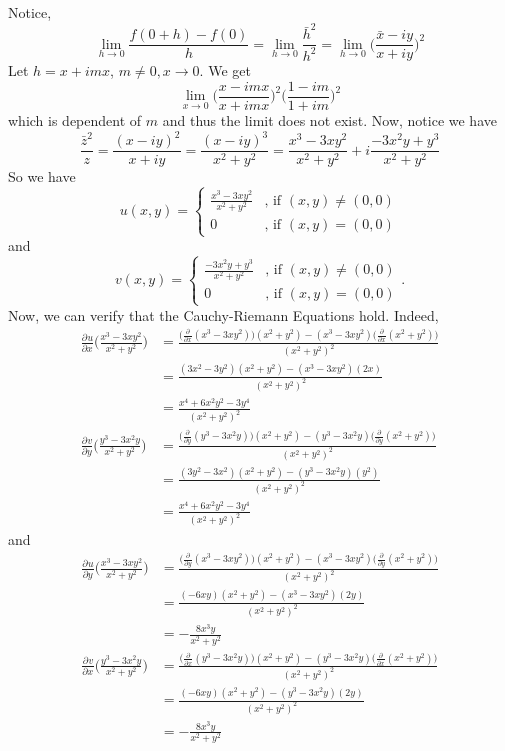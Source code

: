 \documentclass[11pt]{article}
\newcommand*{\pd}[3][]{\ensuremath{\frac{\partial^{#1} #2}{\partial #3^{#1}}}}
\begin{document}
Notice,
\begin{equation*}
\lim_{h \to 0} \frac{f(0+h) - f(0)}{h}
= \lim_{h \to 0} \frac{\bar h^2}{h^2}
= \lim_{h \to 0} \bigg(\frac{\bar x-iy}{x+iy}\bigg)^2
\end{equation*}
Let $h = x + imx$, $m \neq 0, x \to 0$. We get
\begin{equation*}
\lim_{x \to 0} \bigg( \frac{x - imx}{x + imx}\bigg)^2
\bigg( \frac{1 - im}{1 + im}\bigg)^2
\end{equation*}
which is dependent of $m$ and thus the limit does not exist. Now, notice we have
\begin{equation*}
\frac{\bar z^2}{z} = \frac{(x - iy)^2}{x+iy} = \frac{(x-iy)^3}{x^2+y^2}
= \frac{x^3 - 3xy^2}{x^2+y^2} + i \frac{-3x^2y + y^3}{x^2+y^2}
\end{equation*}
So we have
\begin{equation*}
u(x,y) =
\begin{cases}
\frac{x^3 - 3xy^2}{x^2+y^2} & \text{, if } (x,y) \neq (0,0)\\
0 & \text{, if } (x,y) = (0,0)
\end{cases}
\end{equation*}
and
\begin{equation*}
v(x,y) = 
\begin{cases}
\frac{-3x^2y + y^3}{x^2+y^2} & \text{, if } (x,y) \neq (0,0)\\
0 & \text{, if } (x,y) = (0,0)
\end{cases}.
\end{equation*}
Now, we can verify that the Cauchy-Riemann Equations hold. Indeed,
\begin{align*}
\pd{u}{x}\bigg(\frac{x^3 - 3xy^2}{x^2+y^2}\bigg)
&= \frac{\big(\pd{}{x}(x^3 - 3xy^2)\big)(x^2 + y^2) - (x^3 -
3xy^2)\big(\pd{}{x}(x^2+y^2)\big)}{(x^2 + y^2)^2}\\
&= \frac{(3x^2 - 3y^2)(x^2 + y^2) - (x^3 - 3xy^2)(2x)}{(x^2 + y^2)^2}\\
&= \frac{x^4 + 6x^2y^2 - 3y^4}{(x^2 + y^2)^2}\\
\pd{v}{y}\bigg(\frac{y^3 - 3x^2y}{x^2+y^2} \bigg)
&= \frac{\big(\pd{}{y}(y^3 - 3x^2y)\big)(x^2 + y^2) - (y^3 -
3x^2y)\big(\pd{}{y}(x^2+y^2)\big)}{(x^2 + y^2)^2}\\
&= \frac{(3y^2 - 3x^2)(x^2 + y^2) - (y^3 - 3x^2y)(y^2)}{(x^2 + y^2)^2}\\
&= \frac{x^4 + 6x^2y^2 - 3y^4}{(x^2 + y^2)^2}
\end{align*}
and
\begin{align*}
\pd{u}{y}\bigg(\frac{x^3 - 3xy^2}{x^2+y^2}\bigg)
&= \frac{\big(\pd{}{y}(x^3 - 3xy^2)\big)(x^2 + y^2) - (x^3 -
3xy^2)\big(\pd{}{y}(x^2+y^2)\big)}{(x^2 + y^2)^2}\\
&= \frac{(-6xy)(x^2 + y^2) - (x^3 - 3xy^2)(2y)}{(x^2 + y^2)^2}\\
&= -\frac{8x^3y}{x^2 + y^2}\\
\pd{v}{x}\bigg(\frac{y^3 - 3x^2y}{x^2+y^2} \bigg)
&= \frac{\big(\pd{}{x}(y^3 - 3x^2y)\big)(x^2 + y^2) - (y^3 -
3x^2y)\big(\pd{}{x}(x^2+y^2)\big)}{(x^2 + y^2)^2}\\
&= \frac{(-6xy)(x^2 + y^2) - (y^3 - 3x^2y)(2y)}{(x^2 + y^2)^2}\\
&= -\frac{8x^3y}{x^2 + y^2}
\end{align*}
\end{document}
